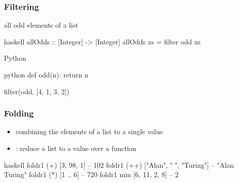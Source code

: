 \documentclass[dvipsnames]{beamer}
\theoremstyle{plain}
\begin{document}
\begin{frame}[fragile]
  \frametitle{Filtering}

  \begin{exampleblock}{all odd elements of a list}
    \begin{pygments}{haskell}
allOdds :: [Integer] -> [Integer]
allOdds xs = filter odd xs
    \end{pygments}
  \end{exampleblock}

  \bigskip
  \begin{exampleblock}{Python}
    \begin{pygments}{python}
def odd(n):
    return n %

filter(odd, [4, 1, 3, 2])
    \end{pygments}
  \end{exampleblock}
\end{frame}

\begin{frame}[fragile]
  \frametitle{Folding}

  \begin{itemize}
    \item combining the elements of a list to a single value
    \item {}: reduce a list to a value over a function
  \end{itemize}

  \begin{exampleblock}{}
    \begin{pygments}{haskell}
foldr1 (+) [3, 98, 1]                -- 102
foldr1 (++) ["Alan", " ", "Turing"]  -- "Alan Turing"
foldr1 (*) [1 .. 6]                  -- 720
foldr1 min [6, 11, 2, 8]             -- 2
    \end{pygments}
  \end{exampleblock}
\end{frame}
\end{document}
